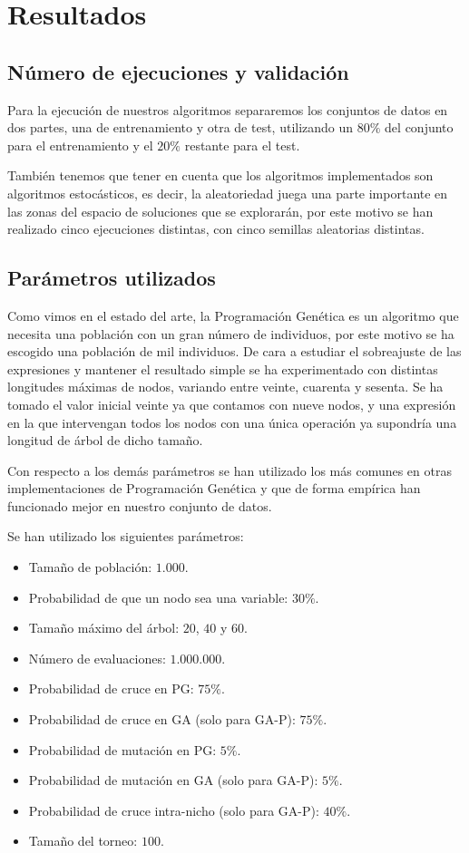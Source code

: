 \section{Resultados}

\subsection{Número de ejecuciones y validación}

Para la ejecución de nuestros algoritmos separaremos los conjuntos de datos en dos partes, una de entrenamiento y otra de test, utilizando un $80\%$ del conjunto para el entrenamiento y el $20\%$ restante para el test.

También tenemos que tener en cuenta que los algoritmos implementados son algoritmos estocásticos, es decir, la aleatoriedad juega una parte importante en las zonas del espacio de soluciones que se explorarán, por este motivo se han realizado cinco ejecuciones distintas, con cinco semillas aleatorias distintas.

\subsection{Parámetros utilizados}

Como vimos en el estado del arte, la Programación Genética es un algoritmo que necesita una población con un gran número de individuos, por este motivo se ha escogido una población de mil individuos. De cara a estudiar el sobreajuste de las expresiones y mantener el resultado simple se ha experimentado con distintas longitudes máximas de nodos, variando entre veinte, cuarenta y sesenta. Se ha tomado el valor inicial veinte ya que contamos con nueve nodos, y una expresión en la que intervengan todos los nodos con una única operación ya supondría una longitud de árbol de dicho tamaño.

Con respecto a los demás parámetros se han utilizado los más comunes en otras implementaciones de Programación Genética y que de forma empírica han funcionado mejor en nuestro conjunto de datos.

Se han utilizado los siguientes parámetros:

\begin{itemize}
	\item Tamaño de población: $1.000$.
	\item Probabilidad de que un nodo sea una variable: $30\%$.
	\item Tamaño máximo del árbol: $20$, $40$ y $60$.
	\item Número de evaluaciones: $1.000.000$.
	\item Probabilidad de cruce en PG: $75\%$.
	\item Probabilidad de cruce en GA (solo para GA-P): $75\%$.
	\item Probabilidad de mutación en PG: $5\%$.
	\item Probabilidad de mutación en GA (solo para GA-P): $5\%$.
	\item Probabilidad de cruce intra-nicho (solo para GA-P): $40\%$.
	\item Tamaño del torneo: $100$.
\end{itemize}

